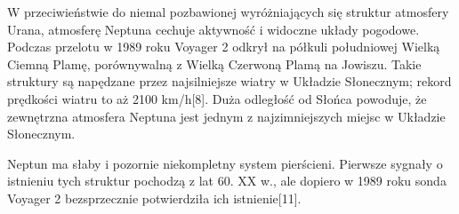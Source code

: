 \documentclass[12pt, letterpaper, titlepage]{article}
\begin{document}
W przeciwieństwie do niemal pozbawionej wyróżniających się struktur atmosfery Urana, atmosferę Neptuna cechuje aktywność i widoczne układy pogodowe. Podczas przelotu w 1989 roku Voyager 2 odkrył na półkuli południowej Wielką Ciemną Plamę, porównywalną z Wielką Czerwoną Plamą na Jowiszu. Takie struktury są napędzane przez najsilniejsze wiatry w Układzie Słonecznym; rekord prędkości wiatru to aż 2100 km/h[8]. Duża odległość od Słońca powoduje, że zewnętrzna atmosfera Neptuna jest jednym z najzimniejszych miejsc w Układzie Słonecznym.

Neptun ma słaby i pozornie niekompletny system pierścieni. Pierwsze sygnały o istnieniu tych struktur pochodzą z lat 60. XX w., ale dopiero w 1989 roku sonda Voyager 2 bezsprzecznie potwierdziła ich istnienie[11].
\end{document}
